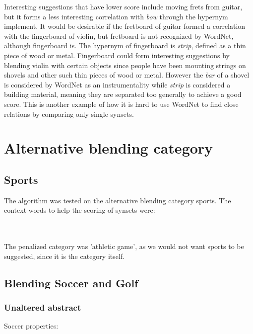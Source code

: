 Interesting suggestions that have lower score include moving frets from guitar, but it forms a less interesting correlation with \emph{bow} through the hypernym implement. It would be desirable if the fretboard of guitar formed a correlation with the fingerboard of violin, but fretboard is not recognized by WordNet, although fingerboard is. The hypernym of fingerboard is \emph{strip}, defined as a thin piece of wood or metal. Fingerboard could form interesting suggestions by blending violin with certain objects since people have been mounting strings on shovels and other such thin pieces of wood or metal. However the \emph{bar} of a shovel is considered by WordNet as an instrumentality while \emph{strip} is considered a building material, meaning they are separated too generally to achieve a good score. This is another example of how it is hard to use WordNet to find close relations by comparing only single synsets.


\section{Alternative blending category}
\subsection{Sports}
The algorithm was tested on the alternative blending category sports. The context words to help the scoring of synsets were:

\noindent{}
\\\\The penalized category was 'athletic game', as we would not want sports to be suggested, since it is the category itself.

\subsection{Blending Soccer and Golf }

\subsubsection{Unaltered abstract}

Soccer properties:

